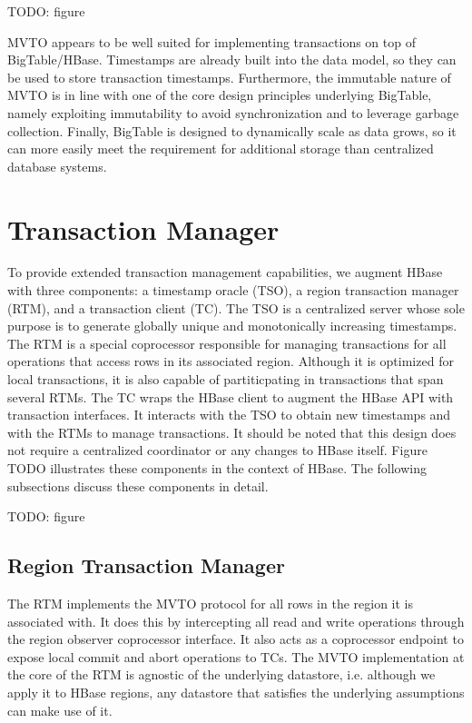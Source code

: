 \documentclass[10pt,final,journal]{IEEEtran}
\begin{document}
TODO: figure

MVTO appears to be well suited for implementing transactions on top of BigTable/HBase. Timestamps are already built into the data model, so they can be used to store transaction timestamps. Furthermore, the immutable nature of MVTO is in line with one of the core design principles underlying BigTable, namely exploiting immutability to avoid synchronization and to leverage garbage collection. Finally, BigTable is designed to dynamically scale as data grows, so it can more easily meet the requirement for additional storage than centralized database systems.

\section{Transaction Manager}
To provide extended transaction management capabilities, we augment HBase with three components: a timestamp oracle (TSO), a region transaction manager (RTM), and a transaction client (TC). The TSO is a centralized server whose sole purpose is to generate globally unique and monotonically increasing timestamps. The RTM is a special coprocessor responsible for managing transactions for all operations that access rows in its associated region. Although it is optimized for local transactions, it is also capable of partiticpating in transactions that span several RTMs. The TC wraps the HBase client to augment the HBase API with transaction interfaces. It interacts with the TSO to obtain new timestamps and with the RTMs to manage transactions. It should be noted that this design does not require a centralized coordinator or any changes to HBase itself. Figure TODO illustrates these components in the context of HBase. The following subsections discuss these components in detail.

TODO: figure

\subsection{Region Transaction Manager}
The RTM implements the MVTO protocol for all rows in the region it is associated with. It does this by intercepting all read and write operations through the region observer coprocessor interface. It also acts as a coprocessor endpoint to expose local commit and abort operations to TCs. The MVTO implementation at the core of the RTM is agnostic of the underlying datastore, i.e. although we apply it to HBase regions, any datastore that satisfies the underlying assumptions can make use of it.
\end{document}
